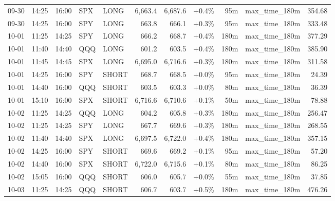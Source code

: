 \documentclass[11pt,a4paper,twoside]{article}
\begin{document}
\begin{center}
\begin{longtable}{>{\color{txtmain}}l l l l l r r r r >{\color{txtmain}}l r}
09-30 & 14:25 & 16:00 & SPX & LONG & 6,663.4 & 6,687.6 & \textcolor{wingreen}{+0.4\%} & 95m & max\_time\_180m & \textcolor{wingreen}{354.68} \\
09-30 & 14:25 & 16:00 & SPY & LONG & 663.8 & 666.1 & \textcolor{wingreen}{+0.3\%} & 95m & max\_time\_180m & \textcolor{wingreen}{333.48} \\
10-01 & 11:25 & 14:25 & SPY & LONG & 666.2 & 668.7 & \textcolor{wingreen}{+0.4\%} & 180m & max\_time\_180m & \textcolor{wingreen}{377.29} \\
10-01 & 11:40 & 14:40 & QQQ & LONG & 601.2 & 603.5 & \textcolor{wingreen}{+0.4\%} & 180m & max\_time\_180m & \textcolor{wingreen}{385.90} \\
10-01 & 11:45 & 14:45 & SPX & LONG & 6,695.0 & 6,716.6 & \textcolor{wingreen}{+0.3\%} & 180m & max\_time\_180m & \textcolor{wingreen}{311.58} \\
10-01 & 14:25 & 16:00 & SPY & SHORT & 668.7 & 668.5 & \textcolor{wingreen}{+0.0\%} & 95m & max\_time\_180m & \textcolor{wingreen}{24.39} \\
10-01 & 14:40 & 16:00 & QQQ & SHORT & 603.5 & 603.3 & \textcolor{wingreen}{+0.0\%} & 80m & max\_time\_180m & \textcolor{wingreen}{36.39} \\
10-01 & 15:10 & 16:00 & SPX & SHORT & 6,716.6 & 6,710.6 & \textcolor{wingreen}{+0.1\%} & 50m & max\_time\_180m & \textcolor{wingreen}{78.88} \\
10-02 & 11:25 & 14:25 & QQQ & LONG & 604.2 & 605.8 & \textcolor{wingreen}{+0.3\%} & 180m & max\_time\_180m & \textcolor{wingreen}{256.47} \\
10-02 & 11:25 & 14:25 & SPY & LONG & 667.7 & 669.6 & \textcolor{wingreen}{+0.3\%} & 180m & max\_time\_180m & \textcolor{wingreen}{268.55} \\
10-02 & 11:40 & 14:40 & SPX & LONG & 6,697.5 & 6,722.0 & \textcolor{wingreen}{+0.4\%} & 180m & max\_time\_180m & \textcolor{wingreen}{357.15} \\
10-02 & 14:25 & 16:00 & SPY & SHORT & 669.6 & 669.2 & \textcolor{wingreen}{+0.1\%} & 95m & max\_time\_180m & \textcolor{wingreen}{57.20} \\
10-02 & 14:40 & 16:00 & SPX & SHORT & 6,722.0 & 6,715.6 & \textcolor{wingreen}{+0.1\%} & 80m & max\_time\_180m & \textcolor{wingreen}{86.25} \\
10-02 & 15:05 & 16:00 & QQQ & SHORT & 606.0 & 605.7 & \textcolor{wingreen}{+0.0\%} & 55m & max\_time\_180m & \textcolor{wingreen}{37.85} \\
10-03 & 11:25 & 14:25 & QQQ & SHORT & 606.7 & 603.7 & \textcolor{wingreen}{+0.5\%} & 180m & max\_time\_180m & \textcolor{wingreen}{476.26} \\

\end{longtable}
\end{center}
\end{document}
